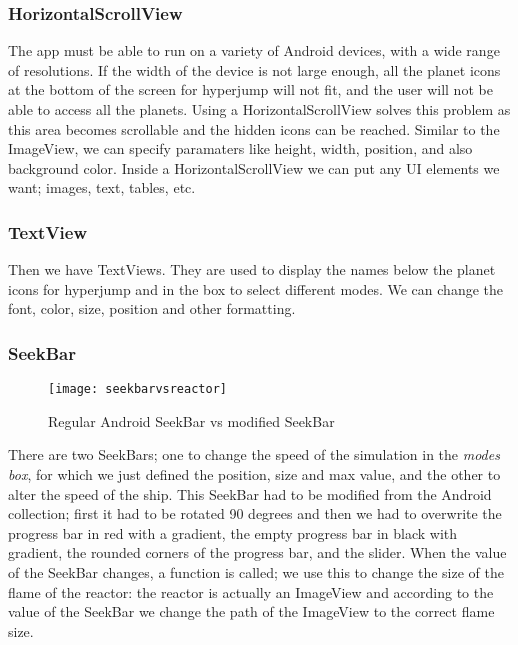 \subsubsection{HorizontalScrollView}

The app must be able to run on a variety of Android devices, with a wide range of resolutions. If the width of the device is not large enough, all the planet icons at the bottom of the screen for hyperjump will not fit, and the user will not be able to access all the planets. Using a HorizontalScrollView solves this problem as this area becomes scrollable and the hidden icons can be reached. Similar to the ImageView, we can specify paramaters like height, width, position, and also background color. Inside a HorizontalScrollView we can put any UI elements we want; images, text, tables, etc.

\subsubsection{TextView}

Then we have TextViews. They are used to display the names below the planet icons for hyperjump and in the box to select different modes. We can change the font, color, size, position and other formatting.

\subsubsection{SeekBar}

\begin{figure}[!htbp]
  \begin{center}
    \leavevmode
    \ifpdf
      \texttt{[image: seekbarvsreactor]}
    \fi
    \caption{Regular Android SeekBar vs modified SeekBar}
    \label{Regular Android SeekBar vs modified SeekBar}
  \end{center}
\end{figure}

There are two SeekBars; one to change the speed of the simulation in the \emph{modes box}, for which we just defined the position, size and max value, and the other to alter the speed of the ship. This SeekBar had to be modified from the Android collection; first it had to be rotated 90 degrees and then we had to overwrite the progress bar in red with a gradient, the empty progress bar in black with gradient, the rounded corners of the progress bar, and the slider. When the value of the SeekBar changes, a function is called; we use this to change the size of the flame of the reactor: the reactor is actually an ImageView and according to the value of the SeekBar we change the path of the ImageView to the correct flame size. 

